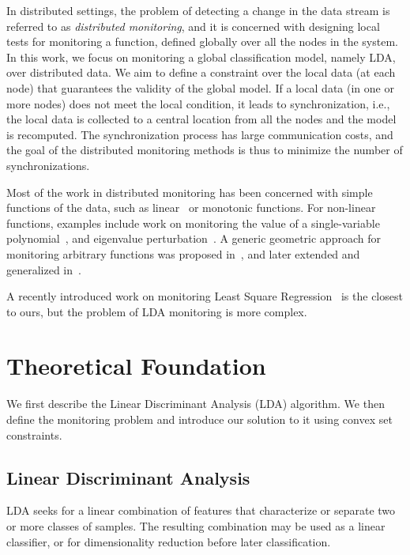 \documentclass{sig-alternate-05-2015}
\begin{document}
In distributed settings, the problem of detecting a change in the data stream is referred to as {\em distributed monitoring}, and it is concerned with designing local tests for monitoring a function, defined globally over all the nodes in the system.
In this work, we focus on monitoring a global classification model, namely LDA, over distributed data.
We aim to define a constraint over the local data (at each node) that guarantees the validity of the global model. If a local data (in one or more nodes) does not meet the local condition, it leads to synchronization, i.e., the local data is collected to a central location from all the nodes and the model is recomputed.
The synchronization process has large communication costs, and the goal of the distributed monitoring methods is thus to minimize the number of synchronizations.

Most of the work in distributed monitoring has been concerned with simple functions of the data, such as linear~\cite{keralapura2006communication, kashyap2008efficient} or monotonic \cite{michel2005klee} functions. For non-linear functions, examples include work on monitoring the value of a single-variable polynomial~\cite{shah2008handling}, and eigenvalue perturbation~\cite{huang2007communication}. A generic geometric approach for monitoring arbitrary functions was proposed in~\cite{sharfman2007geometric}, and later extended and generalized in~\cite{keren2012shape,lazerson2015monitoring}.

A recently introduced work on monitoring Least Square Regression~\cite{gabel2015monitoring} is the closest to ours, but the problem of LDA monitoring is more complex.


\section{Theoretical Foundation}
We first describe the Linear Discriminant Analysis (LDA) algorithm. We then define the monitoring
problem and introduce our solution to it using convex set constraints.

\subsection{Linear Discriminant Analysis}%
LDA seeks for a linear combination of features that characterize or separate two or more classes of samples.
The resulting combination may be used as a linear classifier, or for dimensionality reduction before later classification.
\end{document}
